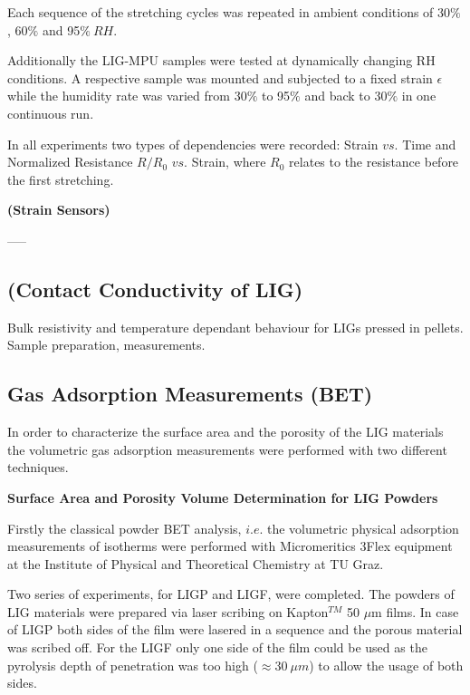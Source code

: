 Each sequence of the stretching cycles was repeated in ambient conditions of 30$\%$, 60$\%$ and 95$\%\: RH$. 

Additionally the LIG-MPU samples were tested at dynamically changing RH conditions. A respective sample was mounted and subjected to a fixed strain $\epsilon$ while the humidity rate was varied from 30$\%$ to 95$\%$ and back to 30$\%$ in one continuous run. 

In all experiments two types of dependencies were recorded: Strain $vs.$ Time and Normalized Resistance $R/R_0$ $vs.$ Strain, where $R_0$ relates to the resistance before the first stretching.

\medskip
\textbf{(Strain Sensors)}

-----


\subsection{(Contact Conductivity of LIG)}


Bulk resistivity and temperature dependant behaviour for LIGs pressed in pellets. Sample preparation, measurements.



\subsection{Gas Adsorption Measurements (BET)}

In order to characterize the surface area and the porosity of the LIG materials the volumetric gas adsorption measurements were performed with two different techniques.

\medskip
\textbf{Surface Area and Porosity Volume Determination for LIG Powders}

Firstly the classical powder BET analysis, $i.e.$ the volumetric physical adsorption measurements of isotherms were performed with Micromeritics 3Flex equipment at the Institute of Physical and Theoretical Chemistry at TU Graz. 

Two series of experiments, for LIGP and LIGF, were completed. The powders of LIG materials were prepared via laser scribing on Kapton$^{TM}$ 50 $\mu$m films. In case of LIGP both sides of the film were lasered in a sequence and the porous material was scribed off. For the LIGF only one side of the film could be used as the pyrolysis depth of penetration was too high ($\approx 30\:\mu m$) to allow the usage of both sides. 

